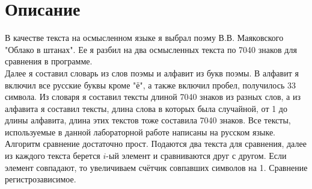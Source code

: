 \section{Описание}

В качестве текста на осмысленном языке я выбрал поэму В.В. Маяковского "Облако в штанах".
Ее я разбил на два осмысленных текста по 7040 знаков для сравнения в программе. \\
Далее я составил словарь из слов поэмы и алфавит из букв поэмы.
В алфавит я включил все русские буквы кроме "ё", а также включил пробел, получилось 33 символа.
Из словаря я составил тексты длиной 7040 знаков из разных слов, а из алфавита я составил тексты, длина слова в которых была случайной, от 1 до длины алфавита, длина этих текстов тоже составила 7040 знаков. Все тексты, используемые в данной лабораторной работе написаны на русском языке.\\

Алгоритм сравнение достаточно прост. Подаются два текста для сравнения, далее из каждого текста берется $i$-ый элемент и сравниваются друг с другом. Если элемент совпадают, то увеличиваем счётчик совпавших символов на 1. Сравнение регистрозависимое.




\pagebreak

